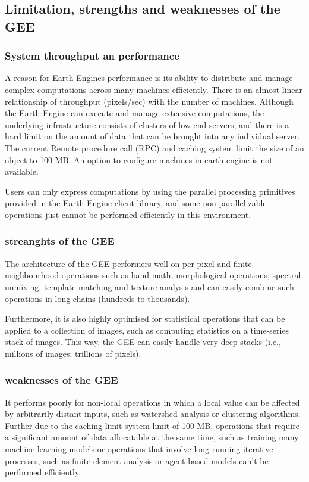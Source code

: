 \subsection{Limitation, strengths and weaknesses of the GEE}

\subsubsection{System throughput an performance}

A reason for Earth Engines performance is its ability to distribute and manage complex computations across many machines efficiently. There is an almost linear relationship of throughput (pixels/sec) with the number of machines.
Although the Earth Engine can execute and manage extensive computations, the underlying infrastructure consists of clusters of low-end servers, and there is a hard limit on the amount of data that can be brought into any individual server. The current Remote procedure call (RPC) and caching system limit the size of an object to 100 MB.
An option to configure machines in earth engine is not available.

Users can only express computations by using the parallel processing primitives provided in the Earth Engine client library, and some non-parallelizable operations just cannot be performed efficiently in this environment.

\subsubsection{streanghts of the GEE}

The architecture of the GEE performers well on per-pixel and finite neighbourhood operations such as band-math, morphological operations, spectral unmixing, template matching and texture analysis and can easily combine such operations in long chains (hundreds to thousands). 

Furthermore, it is also highly optimised for statistical operations
that can be applied to a collection of images, such as computing statistics on a time-series stack of images. This way, the GEE can easily handle very deep stacks (i.e., millions of images; trillions of pixels). 

\subsubsection{weaknesses of the GEE}

It performs poorly for non-local operations in which a local value can be affected by arbitrarily distant inputs, such as watershed analysis or clustering algorithms. Further due to the caching limit system limit of 100 MB, operations that require a significant amount of data allocatable at the same time, such as training many machine learning models or operations that involve long-running iterative processes, such as finite element analysis or agent-based models can't be performed efficiently. 


